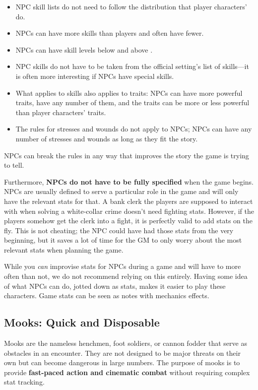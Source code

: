 \begin{WyrdExplanation}
	\begin{itemize}
		\item NPC skill lists do not need to follow the distribution that player characters' do.
		\item NPCs can have more skills than players and often have fewer.
		\item NPCs can have skill levels below \Untrained and above \Expert.
		\item NPC skills do not have to be taken from the official setting's list of skills---it is often more interesting if NPCs have special skills.
		\item What applies to skills also applies to traits: NPCs can have more powerful traits, have any number of them, and the traits can be more or less powerful than player characters' traits.
		\item The rules for stresses and wounds do not apply to NPCs; NPCs can have any number of stresses and wounds as long as they fit the story.
	\end{itemize}
\end{WyrdExplanation}

NPCs can break the rules in any way that improves the story the game is trying to tell.

Furthermore, \textbf{NPCs do not have to be fully specified} when the game begins. NPCs are usually defined to serve a particular role in the game and will only have the relevant stats for that. A bank clerk the players are supposed to interact with when solving a white-collar crime doesn't need fighting stats. However, if the players somehow get the clerk into a fight, it is perfectly valid to add stats on the fly. This is not cheating; the NPC could have had those stats from the very beginning, but it saves a lot of time for the GM to only worry about the most relevant stats when planning the game.

\begin{WyrdGmTips}
	While you \emph{can} improvise stats for NPCs during a game and will have to more often than not, we do not recommend relying on this entirely. Having some idea of what NPCs can do, jotted down as stats, makes it easier to play these characters.	 Game stats can be seen as notes with mechanics effects.
\end{WyrdGmTips}


\subsection{Mooks: Quick and Disposable}
Mooks are the nameless henchmen, foot soldiers, or cannon fodder that serve as obstacles in an encounter. They are not designed to be major threats on their own but can become dangerous in large numbers. The purpose of mooks is to provide \textbf{fast-paced action and cinematic combat} without requiring complex stat tracking.

